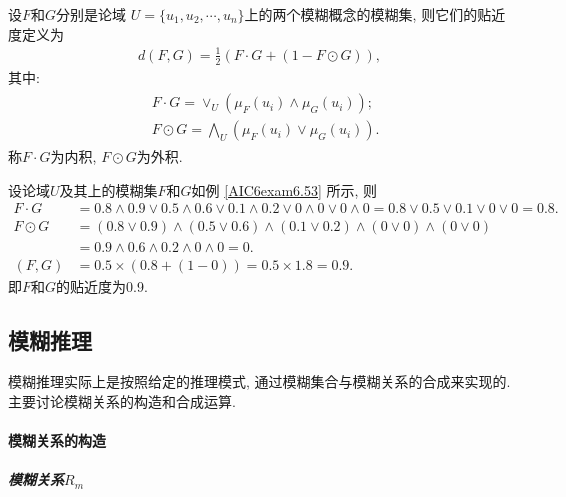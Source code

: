 设$F$和$G$分别是论域 $U=\{u_1, u_2, \cdots, u_n\}$上的两个模糊概念的模糊集, 则它们的贴近度定义为
\begin{align*}
    d(F, G)=\frac 1 2( F\cdot G+(1-F\odot G)),
\end{align*}
其中:
\begin{align*}
\begin{array}{ll}
    &F \cdot G=\vee_{U}\left(\mu_{F}\left(u_{i}\right) \wedge \mu_{G}\left(u_{i}\right)\right);\\
    &F \odot G=\bigwedge_{U}\left(\mu_{F}\left(u_{i}\right) \vee \mu_{G}\left(u_{i}\right)\right).
\end{array}
\end{align*}
称$F\cdot G$为内积, $F\odot G$为外积.
\begin{example}
设论域$U$及其上的模糊集$F$和$G$如例 \ref{AIC6exam6.53} 所示, 则
\begin{align*}
F\cdot G&=0.8\wedge 0.9\vee 0.5\wedge 0.6\vee 0.1\wedge 0.2 \vee  0\wedge 0\vee  0\wedge 0=0.8\vee 0.5\vee 0.1 \vee  0 \vee  0=0.8.\\
F\odot G&= (0.8\vee 0.9)\wedge (0.5\vee 0.6)\wedge (0.1\vee 0.2) \wedge (0\vee 0) \wedge (0\vee 0)\\
        &=0.9\wedge 0.6\wedge 0.2\wedge 0\wedge 0 =0.\\
(F, G)&=0.5\times (0.8+(1-0))=0.5\times 1.8=0.9.
\end{align*}
即$F$和$G$的贴近度为0.9.
\end{example}

\subsection{模糊推理}
模糊推理实际上是按照给定的推理模式, 通过模糊集合与模糊关系的合成来实现的. 主要讨论模糊关系的构造和合成运算.

\paragraph{模糊关系的构造}
\subparagraph{\textbf{模糊关系$R_m$}}

